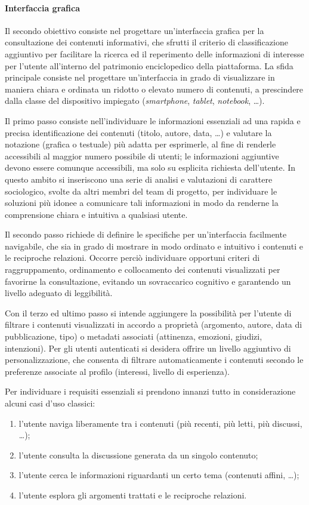 \paragraph{Interfaccia grafica}
Il secondo obiettivo consiste nel progettare un'interfaccia grafica per la consultazione dei contenuti informativi, che sfrutti il criterio di classificazione aggiuntivo per facilitare la ricerca ed il reperimento delle informazioni di interesse per l'utente all'interno del patrimonio enciclopedico della piattaforma. La sfida principale consiste nel progettare un'interfaccia in grado di visualizzare in maniera chiara e ordinata un ridotto o elevato numero di contenuti, a prescindere dalla classe del dispositivo impiegato (\textit{smartphone}, \textit{tablet}, \textit{notebook}, \ldots).

Il primo passo consiste nell'individuare le informazioni essenziali ad una rapida e precisa identificazione dei contenuti (titolo, autore, data, \ldots) e valutare la notazione (grafica o testuale) più adatta per esprimerle, al fine di renderle accessibili al maggior numero possibile di utenti; le informazioni aggiuntive devono essere comunque accessibili, ma solo su esplicita richiesta dell'utente. In questo ambito si inseriscono una serie di analisi e valutazioni di carattere sociologico, svolte da altri membri del team di progetto, per individuare le soluzioni più idonee a comunicare tali informazioni in modo da renderne la comprensione chiara e intuitiva a qualsiasi utente.

Il secondo passo richiede di definire le specifiche per un'interfaccia facilmente navigabile, che sia in grado di mostrare in modo ordinato e intuitivo i contenuti e le reciproche relazioni. Occorre perciò individuare opportuni criteri di raggruppamento, ordinamento e collocamento dei contenuti visualizzati per favorirne la consultazione, evitando un sovraccarico cognitivo e garantendo un livello adeguato di leggibilità.

Con il terzo ed ultimo passo si intende aggiungere la possibilità per l'utente di filtrare i contenuti visualizzati in accordo a proprietà (argomento, autore, data di pubblicazione, tipo) o metadati associati (attinenza, emozioni, giudizi, intenzioni). Per gli utenti autenticati si desidera offrire un livello aggiuntivo di personalizzazione, che consenta di filtrare automaticamente i contenuti secondo le preferenze associate al profilo (interessi, livello di esperienza).

Per individuare i requisiti essenziali si prendono innanzi tutto in considerazione alcuni casi d'uso classici:
\begin{enumerate}
\item l'utente naviga liberamente tra i contenuti (più recenti, più letti, più discussi, \ldots);
\item l'utente consulta la discussione generata da un singolo contenuto;
\item l'utente cerca le informazioni riguardanti un certo tema (contenuti affini, \ldots);
\item l'utente esplora gli argomenti trattati e le reciproche relazioni.
\end{enumerate}

